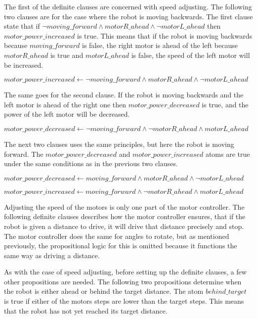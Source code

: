 The first of the definite clauses are concerned with speed adjusting. The following two clauses are for the case where the robot is moving backwards. The first clause state that if $\lnot moving\_forward \land motorR\_ahead \land \lnot motorL\_ahead$ then $motor\_power\_increased$ is true. This means that if the robot is moving backwards because $moving\_forward$ is false, the right motor is ahead of the left because $motorR\_ahead$ is true and $motorL\_ahead$ is false, the speed of the left motor will be increased.

\hspace{3mm} $motor\_power\_increased \leftarrow \lnot moving\_forward \land motorR\_ahead \land \lnot motorL\_ahead$ 

The same goes for the second clause. If the robot is moving backwards and the left motor is ahead of the right one then $motor\_power\_decreased$ is true, and the power of the left motor will be decreased.

\hspace{3mm} $motor\_power\_decreased \leftarrow \lnot moving\_forward \land \lnot motorR\_ahead \land motorL\_ahead$

The next two clauses uses the same principles, but here the robot is moving forward. The $motor\_power\_decreased$ and $motor\_power\_increased$ atoms are true under the same conditions as in the previous two clauses.

\hspace{3mm} $motor\_power\_decreased \leftarrow moving\_forward \land motorR\_ahead \land \lnot motorL\_ahead$

\hspace{3mm} $motor\_power\_increased \leftarrow moving\_forward \land \lnot motorR\_ahead \land motorL\_ahead$

Adjusting the speed of the motors is only one part of the motor controller. The following definite clauses describes how the motor controller ensures, that if the robot is given a distance to drive, it will drive that distance precisely and stop. The motor controller does the same for angles to rotate, but as mentioned previously, the propositional logic for this is omitted because it functions the same way as driving a distance.

As with the case of speed adjusting, before setting up the definite clauses, a few other propositions are needed. The following two propositions determine when the robot is either ahead or behind the target distance. The atom $behind\_target$ is true if either of the motors steps are lower than the target steps. This means that the robot has not yet reached its target distance.

